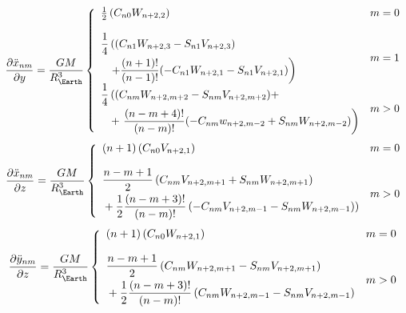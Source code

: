 \begin{equation}
  \label{eq:mont766}
  \frac{\partial \ddot{x} _{nm}}{\partial y} 
    = \frac{GM}{R_{\Earth}^3} \left\{
    \begin{array}{ll}
      
      \frac{1}{2} \left( C_{n0}W_{n+2,2}  \right) & m = 0 \\ [\bigskipamount] 
      
      \begin{aligned}
        \frac{1}{4} & \left( (C_{n1}W_{n+2,3} - S_{n1} V_{n+2,3}) \right. \\
                    & \left.  + \frac{(n+1)!}{(n-1)!}(-C_{n1}W_{n+2,1} - S_{n1}V_{n+2,1}) \right)
      \end{aligned}
      & m = 1 \\ [\bigskipamount]
      
      \begin{aligned}
        \frac{1}{4} & \left( (C_{nm}W_{n+2,m+2} - S_{nm} V_{n+2,m+2}) + \right. \\
                    &  + \left. \frac{(n-m+4)!}{(n-m)!}(-C_{nm}w_{n+2,m-2} + S_{nm}W_{n+2,m-2}) \right) 
      \end{aligned}
      & m > 0
    
    \end{array}
  \right.
\end{equation}
%
\begin{equation}
  \label{eq:mont767}
  \frac{\partial \ddot{x} _{nm}}{\partial z} 
    = \frac{GM}{R_{\Earth}^3} \left\{
    \begin{array}{ll}
      
      (n+1) \left( C_{n0}V_{n+2,1}  \right) & m = 0 \\ [\bigskipamount]
      
      \begin{aligned}
        & \frac{n-m+1}{2} \left( C_{nm}V_{n+2,m+1} + S_{nm} W_{n+2,m+1} \right) \\
        & +\frac{1}{2} \frac{(n-m+3)!}{(n-m)!} \left( -C_{nm}V_{n+2,m-1} - S_{nm}W_{n+2,m-1}) \right) 
      \end{aligned}
      & m > 0
    
    \end{array}
  \right.
\end{equation}
%
\begin{equation}
  \label{eq:mont768}
  \frac{\partial \ddot{y} _{nm}}{\partial z} 
    = \frac{GM}{R_{\Earth}^3} \left\{
    \begin{array}{ll}
      
      (n+1) \left( C_{n0}W_{n+2,1}  \right) & m = 0 \\ [\bigskipamount]
      
      \begin{aligned}
        & \frac{n-m+1}{2} \left( C_{nm}W_{n+2,m+1} - S_{nm} V_{n+2,m+1} \right) \\
        & +\frac{1}{2} \frac{(n-m+3)!}{(n-m)!} \left( C_{nm}W_{n+2,m-1} - S_{nm}V_{n+2,m-1} \right) 
      \end{aligned}
      & m > 0
    
    \end{array}
  \right.
\end{equation}

